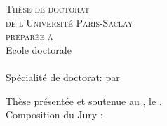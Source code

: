 \vspace{6cm}
\color{blue!20!red!45!black} %
  \begin{center}    
    \LARGE\textsc{Thèse de doctorat\\ de l'Université Paris-Saclay} \\
    \LARGE{\textsc{préparée à \PhDworkingplace}} \\ \bigskip
  \color{black} %
	\vfill
    \Large{Ecole doctorale \no \ecodocnum}\\ %
     \Large{\ecodoctitle}  \\

     \Large{Spécialité de doctorat: \PhDspeciality} %
    \vfill  
   \Large{par}
   \vfill
   \LARGE{\textbf{\textsc{\PhDname}}} %
    \vfill
    \Large{\PhDTitleFR} %
    \vfill
    \bigskip
\end{center}
\color{black}
\begin{flushleft}
Thèse présentée et soutenue au , le . \\
\bigskip
Composition du Jury :
\end{flushleft}

